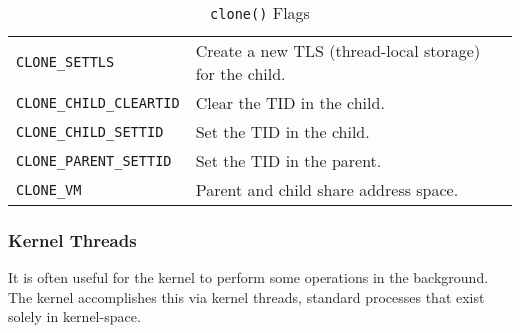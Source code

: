 \begin{table}[h!tbp]
\begin{tabular}{ll}
    \texttt{CLONE_SETTLS} & Create a new TLS (thread-local storage) for the child. \\
    \texttt{CLONE_CHILD_CLEARTID} & Clear the TID in the child. \\
    \texttt{CLONE_CHILD_SETTID} & Set the TID in the child. \\
    \texttt{CLONE_PARENT_SETTID} & Set the TID in the parent. \\
    \texttt{CLONE_VM} & Parent and child share address space. \\
    \bottomrule
  \end{tabular}
  \caption{\texttt{clone()} Flags}
  \label{tab:Clone_Flags}
\end{table}

\subsubsection{Kernel Threads}\label{subsubsec:Kernel_Threads}
It is often useful for the kernel to perform some operations in the background.
The kernel accomplishes this via kernel threads, standard processes that exist solely in kernel-space.


